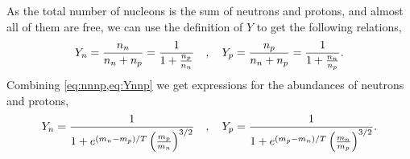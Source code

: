 As the total number of nucleons is the sum of neutrons and protons, and almost all of them are free, we can use the definition of $Y$ to get the following relations,
\begin{align}
    Y_n=\frac{n_n}{n_n+n_p}=\frac{1}{1+\frac{n_p}{n_n}}\quad , \quad Y_p=\frac{n_p}{n_n+n_p}=\frac{1}{1+\frac{n_n}{n_p}}.
    \label{eq:Ynnp}
\end{align}
Combining \cref{eq:nnnp,eq:Ynnp} we get expressions for the abundances of neutrons and protons,
\begin{align}
    Y_n=\frac{1}{1+e^{(m_n-m_p)/T} \left( \frac{m_p}{ m_n} \right)^{3/2}} \quad , \quad Y_p=\frac{1}{1+e^{(m_p-m_n)/T} \left( \frac{m_n}{ m_p} \right)^{3/2}}.
\end{align}